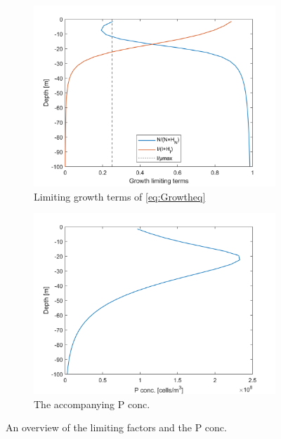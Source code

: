 \begin{figure}[h!]
\centering
\begin{subfigure}{.5\textwidth}
  \centering
  \includegraphics[width=\linewidth]{Pictures/Limitingfactor.png}
  \caption{Limiting growth terms of \cref{eq:Growtheq}}
  \label{fig:LimitingFac}
\end{subfigure}%
\begin{subfigure}{.5\textwidth}
  \centering
  \includegraphics[width=\linewidth]{Pictures/LimitingfactorPplot.png}
  \caption{The accompanying P conc.}
  \label{fig:LimitingFacP}
\end{subfigure}
\caption{An overview of the limiting factors and the P conc.}
\label{fig:Limit}
\end{figure}